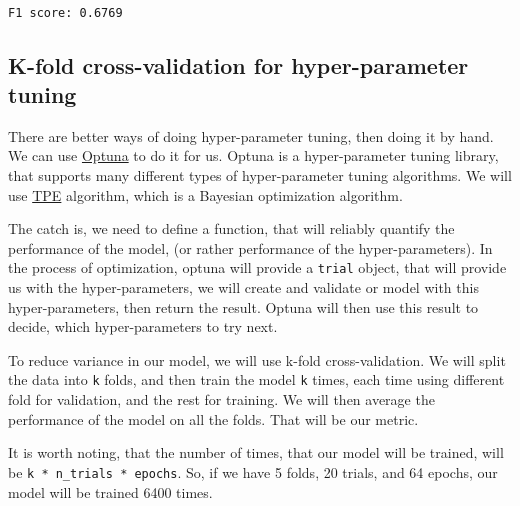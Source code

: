 \documentclass[11pt]{article}
\begin{document}
    \begin{center}
    \end{center}
    { \hspace*{\fill} \\}
    
    \begin{Verbatim}[commandchars=\\\{\}]
F1 score: 0.6769
    \end{Verbatim}

    \hypertarget{k-fold-cross-validation-for-hyper-parameter-tuning}{%
\subsection{K-fold cross-validation for hyper-parameter
tuning}\label{k-fold-cross-validation-for-hyper-parameter-tuning}}

There are better ways of doing hyper-parameter tuning, then doing it by
hand. We can use \href{https://optuna.org/}{Optuna} to do it for us.
Optuna is a hyper-parameter tuning library, that supports many different
types of hyper-parameter tuning algorithms. We will use
\href{https://optuna.readthedocs.io/en/stable/reference/generated/optuna.samplers.TPESampler.html}{TPE}
algorithm, which is a Bayesian optimization algorithm.

The catch is, we need to define a function, that will reliably quantify
the performance of the model, (or rather performance of the
hyper-parameters). In the process of optimization, optuna will provide a
\texttt{trial} object, that will provide us with the hyper-parameters,
we will create and validate or model with this hyper-parameters, then
return the result. Optuna will then use this result to decide, which
hyper-parameters to try next.

To reduce variance in our model, we will use k-fold cross-validation. We
will split the data into \texttt{k} folds, and then train the model
\texttt{k} times, each time using different fold for validation, and the
rest for training. We will then average the performance of the model on
all the folds. That will be our metric.

It is worth noting, that the number of times, that our model will be
trained, will be \texttt{k\ *\ n\_trials\ *\ epochs}. So, if we have 5
folds, 20 trials, and 64 epochs, our model will be trained 6400 times.
\end{document}
